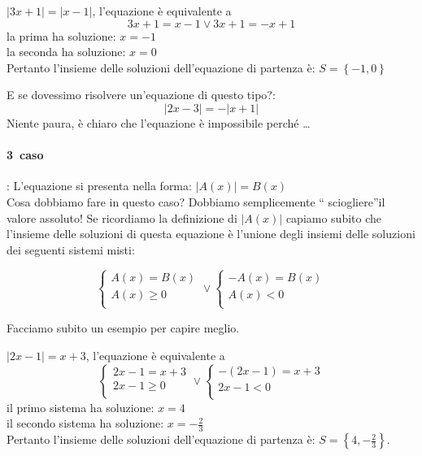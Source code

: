 \begin{esempio} $|3x+1|=|x-1|$, l'equazione è equivalente a
$$3x+1=x-1 \vee 3x+1=-x+1$$
la prima ha soluzione: $x=-1$\\
la seconda ha soluzione: $x=0$\\
Pertanto l'insieme delle soluzioni dell'equazione di partenza è: 
$S=\left\lbrace -1,0 \right\rbrace $ 
\end{esempio}
                
\begin{esempio}
E se dovessimo risolvere un'equazione di questo tipo?:
$$|2x-3|=-|x+1|$$
Niente paura, è chiaro che l'equazione è impossibile perché \dots
\end{esempio}

\paragraph{3\textdegree~caso}: L'equazione si presenta nella forma:  
$|A(x)|=B(x)$\\
Cosa dobbiamo fare in questo caso? Dobbiamo semplicemente \textquotedblleft 
sciogliere\textquotedblright il valore assoluto!
Se ricordiamo la definizione di $|A(x)|$ capiamo subito che l'insieme delle 
soluzioni di questa equazione è l'unione degli insiemi delle soluzioni dei 
seguenti sistemi misti:

$$
\left\lbrace 
\begin{array}{l}
A(x)=B(x)\\
A(x)\geq 0\\
\end{array}
\right.
\vee
\left\lbrace 
\begin{array}{l}
-A(x)=B(x)\\
A(x)< 0\\
\end{array}
\right.
$$

Facciamo subito un esempio per capire meglio.

\begin{esempio}  $|2x-1|=x+3$, l'equazione è equivalente a
$$
\left\lbrace 
\begin{array}{l}
2x-1=x+3\\
2x-1\geq 0\\
\end{array}
\right.
\vee
\left\lbrace 
\begin{array}{l}
-(2x-1)=x+3\\
2x-1< 0\\
\end{array}
\right.
$$
il primo sistema ha soluzione: $x=4$\\
il secondo sistema ha soluzione: $x=-\frac{2}{3}$\\
        Pertanto l'insieme delle soluzioni dell'equazione di partenza è: 
$S=\left\lbrace 4,-\frac{2}{3} \right\rbrace $.
\end{esempio}

